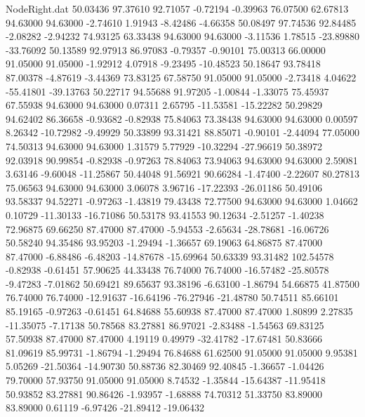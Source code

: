 \begin{filecontents}{NodeRight.dat}
  50.03436   97.37610   92.71057    -0.72194   -0.39963   76.07500   62.67813   94.63000   94.63000   -2.74610    1.91943   -8.42486   -4.66358
  50.08497   97.74536   92.84485    -2.08282   -2.94232   74.93125   63.33438   94.63000   94.63000   -3.11536    1.78515  -23.89880  -33.76092
  50.13589   92.97913   86.97083    -0.79357   -0.90101   75.00313   66.00000   91.05000   91.05000   -1.92912    4.07918   -9.23495  -10.48523
  50.18647   93.78418   87.00378    -4.87619   -3.44369   73.83125   67.58750   91.05000   91.05000   -2.73418    4.04622  -55.41801  -39.13763
  50.22717   94.55688   91.97205    -1.00844   -1.33075   75.45937   67.55938   94.63000   94.63000    0.07311    2.65795  -11.53581  -15.22282
  50.29829   94.62402   86.36658    -0.93682   -0.82938   75.84063   73.38438   94.63000   94.63000    0.00597    8.26342  -10.72982   -9.49929
  50.33899   93.31421   88.85071    -0.90101   -2.44094   77.05000   74.50313   94.63000   94.63000    1.31579    5.77929  -10.32294  -27.96619
  50.38972   92.03918   90.99854    -0.82938   -0.97263   78.84063   73.94063   94.63000   94.63000    2.59081    3.63146   -9.60048  -11.25867
  50.44048   91.56921   90.66284    -1.47400   -2.22607   80.27813   75.06563   94.63000   94.63000    3.06078    3.96716  -17.22393  -26.01186
  50.49106   93.58337   94.52271    -0.97263   -1.43819   79.43438   72.77500   94.63000   94.63000    1.04662    0.10729  -11.30133  -16.71086
  50.53178   93.41553   90.12634    -2.51257   -1.40238   72.96875   69.66250   87.47000   87.47000   -5.94553   -2.65634  -28.78681  -16.06726
  50.58240   94.35486   93.95203    -1.29494   -1.36657   69.19063   64.86875   87.47000   87.47000   -6.88486   -6.48203  -14.87678  -15.69964
  50.63339   93.31482  102.54578    -0.82938   -0.61451   57.90625   44.33438   76.74000   76.74000  -16.57482  -25.80578   -9.47283   -7.01862
  50.69421   89.65637   93.38196    -6.63100   -1.86794   54.66875   41.87500   76.74000   76.74000  -12.91637  -16.64196  -76.27946  -21.48780
  50.74511   85.66101   85.19165    -0.97263   -0.61451   64.84688   55.60938   87.47000   87.47000    1.80899    2.27835  -11.35075   -7.17138
  50.78568   83.27881   86.97021    -2.83488   -1.54563   69.83125   57.50938   87.47000   87.47000    4.19119    0.49979  -32.41782  -17.67481
  50.83666   81.09619   85.99731    -1.86794   -1.29494   76.84688   61.62500   91.05000   91.05000    9.95381    5.05269  -21.50364  -14.90730
  50.88736   82.30469   92.40845    -1.36657   -1.04426   79.70000   57.93750   91.05000   91.05000    8.74532   -1.35844  -15.64387  -11.95418
  50.93852   83.27881   90.86426    -1.93957   -1.68888   74.70312   51.33750   83.89000   83.89000    0.61119   -6.97426  -21.89412  -19.06432

\end{filecontents}
